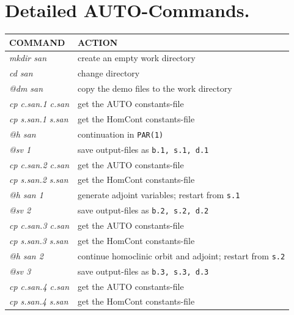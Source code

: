 \documentclass[12pt]{report}
\begin{document}
\newpage
\section{ Detailed {\cal AUTO}-Commands.}

\begin{table}[htbp]
\begin{center}
\begin{tabular}{| l | l |}
\hline
  COMMAND  & ACTION \\
\hline
  {\it mkdir san} & create an empty work directory \\ 
  {\it cd san} & change directory \\
  {\it @dm san} & copy the demo files to the work directory \\
\hline
  {\it cp c.san.1 c.san} & get the AUTO constants-file \\ 
  {\it cp s.san.1 s.san} & get the HomCont constants-file \\ 
  {\it @h san} &  continuation in {\tt PAR(1)} \\ 
  {\it @sv 1} & save output-files as {\tt b.1, s.1, d.1} \\ 
\hline
  {\it cp c.san.2 c.san} & get the AUTO constants-file \\ 
  {\it cp s.san.2 s.san} & get the HomCont constants-file \\ 
  {\it @h san 1} & generate adjoint variables; restart from {\tt s.1} \\ 
  {\it @sv 2} & save output-files as {\tt b.2, s.2, d.2} \\ 
\hline
  {\it cp c.san.3 c.san} & get the AUTO constants-file \\ 
  {\it cp s.san.3 s.san} & get the HomCont constants-file \\ 
  {\it @h san 2} & continue homoclinic orbit and adjoint; restart from {\tt s.2} \\ 
  {\it @sv 3} & save output-files as {\tt b.3, s.3, d.3} \\ 
\hline
  {\it cp c.san.4 c.san} & get the AUTO constants-file \\ 
  {\it cp s.san.4 s.san} & get the HomCont constants-file \\ 

\end{tabular}
\end{center}
\end{table}
\end{document}
